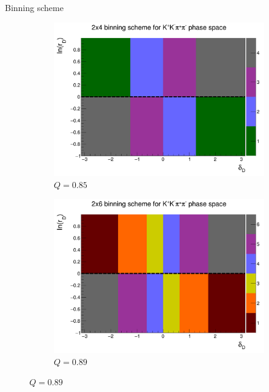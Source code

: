 \documentclass{beamer}
\begin{document}
\begin{frame}{Binning scheme}
  \begin{figure}
    \centering
    \vspace{-0.2cm}
    \begin{subfigure}{0.5\textwidth}
      \includegraphics[width = 1.0\textwidth]{Plots/BinningSchemePlot_4Bins.png}
      \caption{$Q = 0.85$}
    \end{subfigure}%
    \begin{subfigure}{0.5\textwidth}
      \includegraphics[width = 1.0\textwidth]{Plots/BinningSchemePlot_6Bins.png}
      \caption{$Q = 0.89$}
    \end{subfigure}
  \end{figure}
\end{frame}
\end{document}
